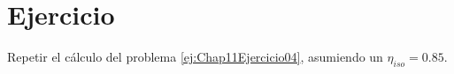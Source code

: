 \section{Ejercicio}\label{ej:Chap11Ejercicio05}
Repetir el cálculo del problema \ref{ej:Chap11Ejercicio04}, asumiendo un $\eta_{iso}=0.85$.